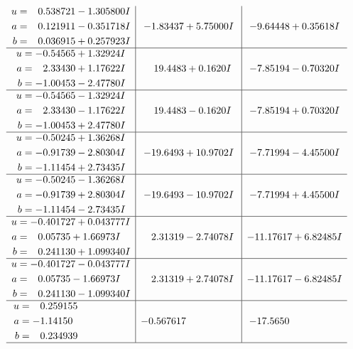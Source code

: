 \documentclass[1p]{elsarticle_modified}
\theoremstyle{definition}
\begin{document}
$$\begin{array}{c|c|c}
\begin{aligned}
u &= \phantom{-}0.538721 - 1.305800 I \\
a &= \phantom{-}0.121911 - 0.351718 I \\
b &= \phantom{-}0.036915 + 0.257923 I\end{aligned}
 & -1.83437 + 5.75000 I & -9.64448 + 0.35618 I \\ \hline\begin{aligned}
u &= -0.54565 + 1.32924 I \\
a &= \phantom{-}2.33430 + 1.17622 I \\
b &= -1.00453 - 2.47780 I\end{aligned}
 & \phantom{-}19.4483 + 0.1620 I & -7.85194 - 0.70320 I \\ \hline\begin{aligned}
u &= -0.54565 - 1.32924 I \\
a &= \phantom{-}2.33430 - 1.17622 I \\
b &= -1.00453 + 2.47780 I\end{aligned}
 & \phantom{-}19.4483 - 0.1620 I & -7.85194 + 0.70320 I \\ \hline\begin{aligned}
u &= -0.50245 + 1.36268 I \\
a &= -0.91739 - 2.80304 I \\
b &= -1.11454 + 2.73435 I\end{aligned}
 & -19.6493 + 10.9702 I & -7.71994 - 4.45500 I \\ \hline\begin{aligned}
u &= -0.50245 - 1.36268 I \\
a &= -0.91739 + 2.80304 I \\
b &= -1.11454 - 2.73435 I\end{aligned}
 & -19.6493 - 10.9702 I & -7.71994 + 4.45500 I \\ \hline\begin{aligned}
u &= -0.401727 + 0.043777 I \\
a &= \phantom{-}0.05735 + 1.66973 I \\
b &= \phantom{-}0.241130 + 1.099340 I\end{aligned}
 & \phantom{-}2.31319 - 2.74078 I & -11.17617 + 6.82485 I \\ \hline\begin{aligned}
u &= -0.401727 - 0.043777 I \\
a &= \phantom{-}0.05735 - 1.66973 I \\
b &= \phantom{-}0.241130 - 1.099340 I\end{aligned}
 & \phantom{-}2.31319 + 2.74078 I & -11.17617 - 6.82485 I \\ \hline\begin{aligned}
u &= \phantom{-}0.259155\phantom{ +0.000000I} \\
a &= -1.14150\phantom{ +0.000000I} \\
b &= \phantom{-}0.234939\phantom{ +0.000000I}\end{aligned}
 & -0.567617\phantom{ +0.000000I} & -17.5650\phantom{ +0.000000I}\\
 \hline 
 \end{array}$$\newpage\newpage\renewcommand{\arraystretch}{1}
\end{document}
